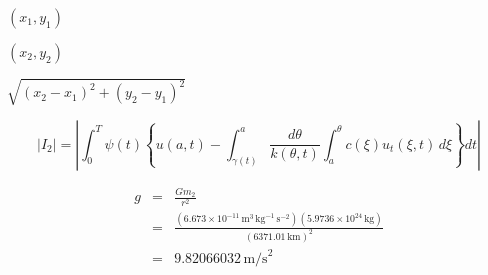\documentclass{article}
\begin{document}
$(x_1,y_1)$
\pagebreak

$(x_2,y_2)$
\pagebreak

$\sqrt{(x_2-x_1)^2+(y_2-y_1)^2}$
\pagebreak

\[
    |I_2|=\left| \int_{0}^T \psi(t) 
             \left\{ 
                u(a,t)-
                \int_{\gamma(t)}^a 
                \frac{d\theta}{k(\theta,t)}
                \int_{a}^\theta c(\xi)u_t(\xi,t)\,d\xi
             \right\} dt
          \right|
  \]
\pagebreak

\begin{eqnarray*}
        g &=& \frac{Gm_2}{r^2} \\ 
          &=& \frac{(6.673 \times 10^{-11}\,\mbox{m}^3\,\mbox{kg}^{-1}\,
              \mbox{s}^{-2})(5.9736 \times 10^{24}\,\mbox{kg})}{(6371.01\,\mbox{km})^2} \\ 
          &=& 9.82066032\,\mbox{m/s}^2
   \end{eqnarray*}
\pagebreak
\end{document}

